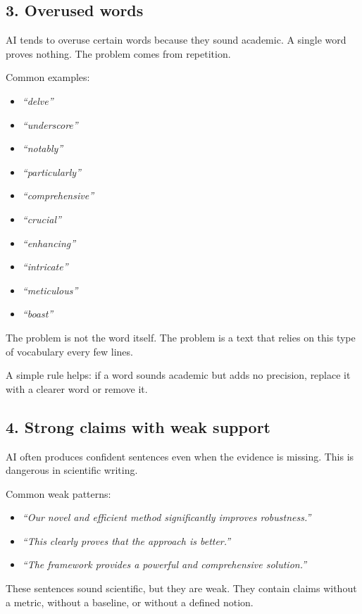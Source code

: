 \documentclass[11pt,a4paper]{article}
\theoremstyle{definition}
\begin{document}
\subsection*{3. Overused words}

AI tends to overuse certain words because they sound academic.
A single word proves nothing. The problem comes from repetition.

Common examples:
\begin{itemize}
    \item \textit{``delve''}
    \item \textit{``underscore''}
    \item \textit{``notably''}
    \item \textit{``particularly''}
    \item \textit{``comprehensive''}
    \item \textit{``crucial''}
    \item \textit{``enhancing''}
    \item \textit{``intricate''}
    \item \textit{``meticulous''}
    \item \textit{``boast''}
\end{itemize}

The problem is not the word itself. The problem is a text that relies on this type of vocabulary every few lines.

A simple rule helps: if a word sounds academic but adds no precision, replace it with a clearer word or remove it.

\subsection*{4. Strong claims with weak support}

AI often produces confident sentences even when the evidence is missing.
This is dangerous in scientific writing.

Common weak patterns:
\begin{itemize}
    \item \textit{``Our novel and efficient method significantly improves robustness.''}
    \item \textit{``This clearly proves that the approach is better.''}
    \item \textit{``The framework provides a powerful and comprehensive solution.''}
\end{itemize}

These sentences sound scientific, but they are weak. They contain claims without a metric, without a baseline, or without a defined notion.
\end{document}
